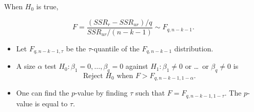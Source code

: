 \documentclass[notes=show,compress,beamer]{beamer}
\begin{document}
\begin{frame}%


When $H_{0}$ is true,

\begin{equation*}
F=\frac{\left( SSR_{r}-SSR_{ur}\right) /q}{SSR_{ur}/\left( n-k-1\right) }%
\sim F_{q,n-k-1}.
\end{equation*}%
\pause%

\begin{itemize}
\item Let $F_{q,n-k-1,\tau }$ be the $\tau $-quantile of the $F_{q,n-k-1}$
distribution.%
\pause%

\item A size $\alpha $ test $H_{0}:\beta _{1}=0,\ldots ,\beta _{q}=0$
against $H_{1}:\beta _{1}\neq 0$ or \ldots\ or $\beta _{q}\neq 0$ is%
\pause%
\begin{equation*}
\text{Reject }H_{0}\text{ when }F>F_{q,n-k-1,1-\alpha }.
\end{equation*}%
\pause%

\item One can find the $p$-value by finding $\tau $ such that $%
F=F_{q,n-k-1,1-\tau }.$ The $p$-value is equal to $\tau .$
\end{itemize}

\end{frame}%
\end{document}
